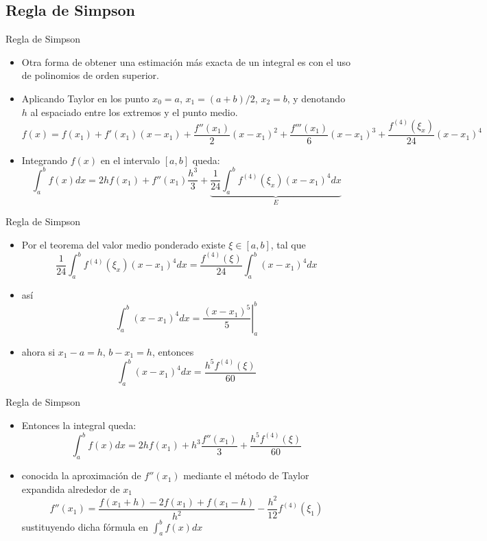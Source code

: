 \documentclass[12pt]{beamer}
\begin{document}
  \subsection{Regla de Simpson}
  \begin{frame}{Regla de Simpson}
    \begin{itemize}
      \item Otra forma de obtener una estimaci\'on m\'as exacta de un integral es con el uso de polinomios de orden superior.
      \item<2-> Aplicando Taylor en los punto $x_0=a$, $x_1=(a+b)/2$, $x_2=b$, y denotando $h$ al espaciado entre los extremos y el punto medio.
      \scriptsize
      $$
      f(x) = f(x_1) + f'(x_1)(x-x_1) + \frac{f''(x_1)}{2}(x-x_1)^2 + \frac{f'''(x_1)}{6}(x-x_1)^3 + \frac{f^{(4)}(\xi_x)}{24}(x-x_1)^4
      $$
      \item<3-> \normalsize
      Integrando $f(x)$ en el intervalo $[a,b]$ queda:
      $$
      \int_a^bf(x)dx = 2hf(x_1) + f''(x_1)\frac{h^3}{3} + \underbrace{\frac{1}{24}\int_a^bf^{(4)}(\xi_x)(x-x_1)^4dx}_E
      $$      
    \end{itemize}    
  \end{frame}
\begin{frame}{Regla de Simpson}
  \begin{itemize}
    \item Por el teorema del valor medio ponderado existe $\xi \in [a, b]$, tal que
    $$
    \dfrac{1}{24}\int_{a}^{b}f^{(4)}(\xi_x)(x-x_1)^4dx = \dfrac{f^{(4)}(\xi)}{24}\int_{a}^{b}(x-x_1)^4dx
    $$
    \item<2->as\'i
    $$
    \int_{a}^{b}(x-x_1)^4dx = \left.\dfrac{(x-x_1)^5}{5}\right|_{a}^{b}
    $$
    \item<3->
    ahora si $x_1 - a = h$, $b - x_1 = h$, entonces
    $$
    \int_{a}^{b}(x-x_1)^4dx = \dfrac{h^5f^{(4)}(\xi)}{60}
    $$
  \end{itemize}
\end{frame}
\begin{frame}{Regla de Simpson}
  \begin{itemize}
    \item Entonces la integral queda:
    $$
    \int_{a}^{b}f(x)dx = 2hf(x_1) + h^3\dfrac{f''(x_1)}{3} + \dfrac{h^5f^{(4)}(\xi)}{60}
    $$
    \item<2-> conocida la aproximaci\'on de $f''(x_1)$ mediante el m\'etodo de Taylor expandida alrededor de $x_1$
    $$
    f''(x_1) = \frac{f(x_1+h) - 2f(x_1) + f(x_1-h)}{h^2} - \frac{h^2}{12}f^{(4)}(\xi_1)
    $$
    sustituyendo dicha f\'ormula en $\displaystyle\int_a^bf(x)dx$
  \end{itemize}
  \end{frame}
\end{document}

